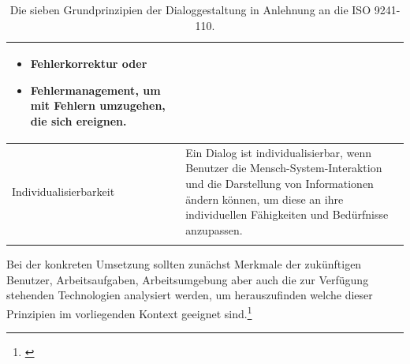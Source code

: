 \begin{center}
\begin{longtable}{|p{5.1cm}|p{9.56cm}|}
\begin{itemize}
  \item Fehlerkorrektur oder
  \item Fehlermanagement, um mit Fehlern umzugehen, die sich ereignen.
\end{itemize} \\ \hline
Individualisierbarkeit & Ein Dialog ist individualisierbar, wenn Benutzer die Mensch-System-Interaktion und die Darstellung von Informationen ändern können, um diese an ihre individuellen Fähigkeiten und Bedürfnisse anzupassen.\\ \hline
\caption{Die sieben Grundprinzipien der Dialoggestaltung in Anlehnung an die ISO 9241-110.}
\label{tab:siebenGrundprinzipien}
\end{longtable}
\end{center}
Bei der konkreten Umsetzung sollten zunächst Merkmale der zukünftigen Benutzer, Arbeitsaufgaben, Arbeitsumgebung aber auch die zur Verfügung stehenden Technologien analysiert werden, um herauszufinden welche dieser Prinzipien im vorliegenden Kontext geeignet sind.\footnote{\cite[vgl.][]{Figl2010}}

